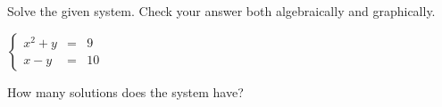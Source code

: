 \documentclass{ximera}
\author{Kenneth Berglund}
\begin{document}
\licenseSZ

Solve the given system. Check your answer both algebraically and graphically.

$\left\{ \begin{array}{rcr} x^2+y & = & 9  \\ x-y  & = & 10  \end{array} \right.$

\begin{exercise}
How many solutions does the system have?
\begin{multipleChoice}  
\end{multipleChoice}  
\end{exercise}
\end{document}
